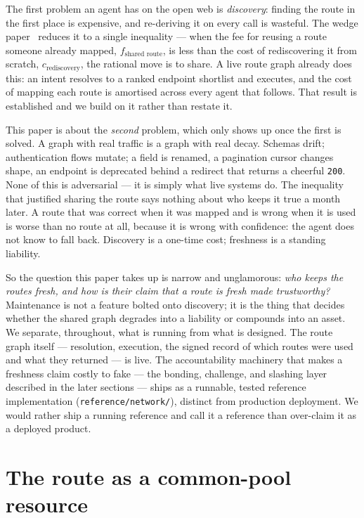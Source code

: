 \documentclass[11pt]{article}
\begin{document}
The first problem an agent has on the open web is \emph{discovery}: finding the
route in the first place is expensive, and re-deriving it on every call is
wasteful. The wedge paper~\cite{wedge} reduces it to a single inequality --- when the fee for
reusing a route someone already mapped, $f_{\text{shared route}}$, is less than
the cost of rediscovering it from scratch, $c_{\text{rediscovery}}$, the rational
move is to share. A live route graph already does this: an intent resolves to a
ranked endpoint shortlist and executes, and the cost of mapping each route is
amortised across every agent that follows. That result is established and we build
on it rather than restate it.

This paper is about the \emph{second} problem, which only shows up once the first
is solved. A graph with real traffic is a graph with real decay. Schemas drift;
authentication flows mutate; a field is renamed, a pagination cursor changes
shape, an endpoint is deprecated behind a redirect that returns a cheerful
\texttt{200}. None of this is adversarial --- it is simply what live systems do.
The inequality that justified sharing the route says nothing about who keeps it
true a month later. A route that was correct when it was mapped and is wrong when
it is used is worse than no route at all, because it is wrong with confidence: the
agent does not know to fall back. Discovery is a one-time cost; freshness is a
standing liability.

So the question this paper takes up is narrow and unglamorous: \emph{who keeps the
routes fresh, and how is their claim that a route is fresh made trustworthy?}
Maintenance is not a feature bolted onto discovery; it is the thing that decides
whether the shared graph degrades into a liability or compounds into an asset. We
separate, throughout, what is running from what is designed. The route graph
itself --- resolution, execution, the signed record of which routes were used and
what they returned --- is live. The accountability machinery that makes a
freshness claim costly to fake --- the bonding, challenge, and slashing layer
described in the later sections --- ships as a runnable, tested reference
implementation (\texttt{reference/network/}), distinct from production deployment.
We would rather ship a running reference and call it a reference than over-claim it
as a deployed product.

\section{The route as a common-pool resource}
\end{document}
